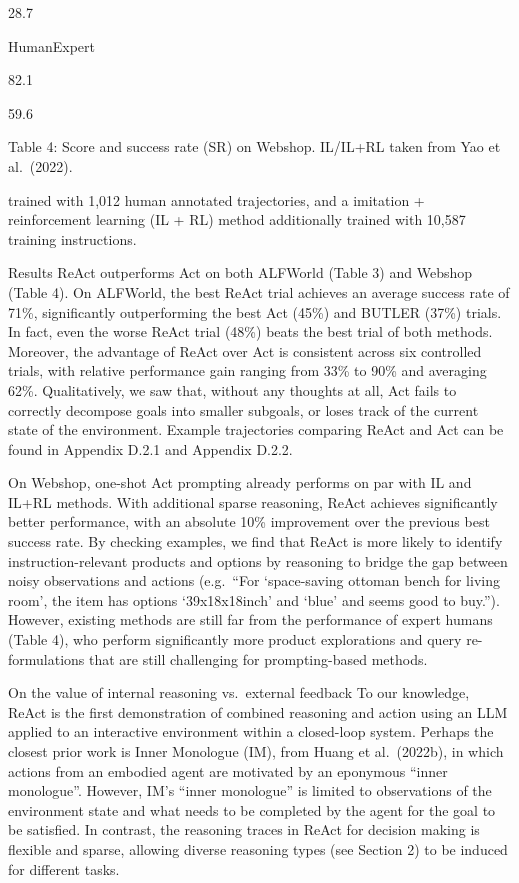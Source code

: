 \documentclass[
]{article}
\begin{document}
28.7

HumanExpert

82.1

59.6

Table 4: Score and success rate (SR) on Webshop. IL/IL+RL taken from Yao
et al.~(2022).

trained with 1,012 human annotated trajectories, and a imitation +
reinforcement learning (IL + RL) method additionally trained with 10,587
training instructions.

Results ReAct outperforms Act on both ALFWorld (Table 3) and Webshop
(Table 4). On ALFWorld, the best ReAct trial achieves an average success
rate of 71\%, significantly outperforming the best Act (45\%) and BUTLER
(37\%) trials. In fact, even the worse ReAct trial (48\%) beats the best
trial of both methods. Moreover, the advantage of ReAct over Act is
consistent across six controlled trials, with relative performance gain
ranging from 33\% to 90\% and averaging 62\%. Qualitatively, we saw
that, without any thoughts at all, Act fails to correctly decompose
goals into smaller subgoals, or loses track of the current state of the
environment. Example trajectories comparing ReAct and Act can be found
in Appendix D.2.1 and Appendix D.2.2.

On Webshop, one-shot Act prompting already performs on par with IL and
IL+RL methods. With additional sparse reasoning, ReAct achieves
significantly better performance, with an absolute 10\% improvement over
the previous best success rate. By checking examples, we find that ReAct
is more likely to identify instruction-relevant products and options by
reasoning to bridge the gap between noisy observations and actions
(e.g.~``For `space-saving ottoman bench for living room', the item has
options `39x18x18inch' and `blue' and seems good to buy.''). However,
existing methods are still far from the performance of expert humans
(Table 4), who perform significantly more product explorations and query
re-formulations that are still challenging for prompting-based methods.

On the value of internal reasoning vs.~external feedback To our
knowledge, ReAct is the first demonstration of combined reasoning and
action using an LLM applied to an interactive environment within a
closed-loop system. Perhaps the closest prior work is Inner Monologue
(IM), from Huang et al.~(2022b), in which actions from an embodied agent
are motivated by an eponymous ``inner monologue''. However, IM's ``inner
monologue'' is limited to observations of the environment state and what
needs to be completed by the agent for the goal to be satisfied. In
contrast, the reasoning traces in ReAct for decision making is flexible
and sparse, allowing diverse reasoning types (see Section 2) to be
induced for different tasks.
\end{document}
